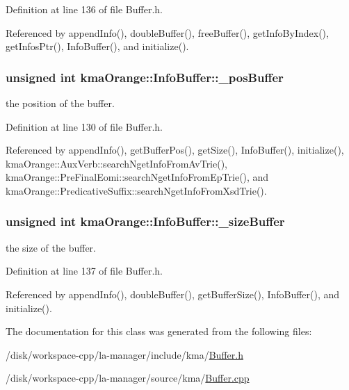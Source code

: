 Definition at line 136 of file Buffer.h.

Referenced by appendInfo(), doubleBuffer(), freeBuffer(), getInfoByIndex(), getInfosPtr(), InfoBuffer(), and initialize().\hypertarget{classkmaOrange_1_1InfoBuffer_99ad572af37af11ea1aeb7e82df01d18}{
\subsubsection[{\_\-posBuffer}]{\setlength{\rightskip}{0pt plus 5cm}unsigned int {\bf kmaOrange::InfoBuffer::\_\-posBuffer}}}
\label{classkmaOrange_1_1InfoBuffer_99ad572af37af11ea1aeb7e82df01d18}


the position of the buffer. 



Definition at line 130 of file Buffer.h.

Referenced by appendInfo(), getBufferPos(), getSize(), InfoBuffer(), initialize(), kmaOrange::AuxVerb::searchNgetInfoFromAvTrie(), kmaOrange::PreFinalEomi::searchNgetInfoFromEpTrie(), and kmaOrange::PredicativeSuffix::searchNgetInfoFromXsdTrie().\hypertarget{classkmaOrange_1_1InfoBuffer_61f70057748766b665d4858562935716}{
\subsubsection[{\_\-sizeBuffer}]{\setlength{\rightskip}{0pt plus 5cm}unsigned int {\bf kmaOrange::InfoBuffer::\_\-sizeBuffer}}}
\label{classkmaOrange_1_1InfoBuffer_61f70057748766b665d4858562935716}


the size of the buffer. 



Definition at line 137 of file Buffer.h.

Referenced by appendInfo(), doubleBuffer(), getBufferSize(), InfoBuffer(), and initialize().

The documentation for this class was generated from the following files:\begin{CompactItemize}
\item 
/disk/workspace-cpp/la-manager/include/kma/\hyperlink{Buffer_8h}{Buffer.h}\item 
/disk/workspace-cpp/la-manager/source/kma/\hyperlink{Buffer_8cpp}{Buffer.cpp}\end{CompactItemize}

